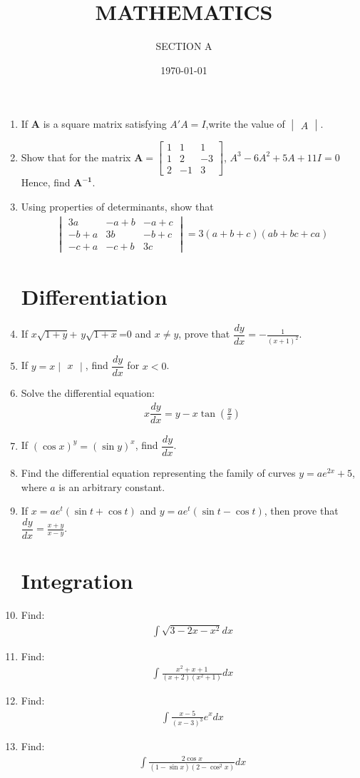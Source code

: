\documentclass[2pt,-letter paper]{article}
\title{MATHEMATICS}
\author{SECTION A}
\date{\today}
\let\vec\mathbf{}
\let\vec\mathbf{}
\let\vec\mathbf{}
\providecommand{\mydet}[1]{\ensuremath{\begin{vmatrix}#1\end{vmatrix}}}
\providecommand{\myvec}[1]{\ensuremath{\begin{bmatrix}#1\end{bmatrix}}}
\providecommand{\brak}[1]{\ensuremath{\left(#1\right)}}
\begin{document}
\maketitle

\begin{enumerate}
\section{Matrix}
\item If $\vec{A}$ is a square matrix satisfying $A'A = I$,write the value of $\mydet{A}$.
\item Show that for the matrix $\vec{A}=\myvec{1&1&1 \\ 1&2&-3 \\ 2&-1&3}$, ${A}^3-6{A}^2+5{A}+11{I}=0$ Hence, find $\vec{A^{-1}}$.
\item Using properties of determinants, show that 
\begin{align*}
\mydet{3a & -a+b & -a+c \\ -b+a & 3b & -b+c \\ -c+a & -c+b & 3c} = 3\brak{a+b+c}\brak{ab+bc+ca}
\end{align*}
\section{Differentiation}
\item If $x\sqrt{1+y}$+ $y\sqrt{1+x}$=0 and $x\neq y$, prove that $\dfrac{dy}{dx} = -\frac{1}{\brak{x+1}^2}$.
\item If $y=x\mydet{x}$, find $\dfrac{dy}{dx}$ for $x < 0$.
\item Solve the differential equation: 
\begin{align*}
{x}\dfrac{dy}{dx}= {y}-{x}\tan\brak{\frac{y}{x}}
\end{align*}
\item If $\brak{\cos x}^y = \brak{\sin y }^x$, find $\dfrac{dy}{dx}$.
\item Find the differential equation representing the family of curves ${y}=ae^{2x}+5$, where $a$ is an arbitrary constant.
\item If ${x}=ae^t\brak{\sin{t}+\cos{t}}$ and ${y}=ae^t\brak{\sin{t}-\cos{t}}$, then prove that $\dfrac{dy}{dx}=\frac{x+y}{x-y}$.
\section{Integration}
\item Find: \begin{align*}\int\sqrt{3-2x-x^2}dx\end{align*}
\item Find: \begin{align*}\int{\frac{x^2+x+1}{\brak{x+2}\brak{x^2+1}}}dx\end{align*}
\item Find: 
 \begin{align*}
 \int{\frac{x-5}{\brak{x-3}^3}}e^x dx
 \end{align*}
\item Find: 
\begin{align*}
\int{\frac{2\cos x}{\brak{1-\sin x}\brak{2-\cos^2 x}}}dx
\end{align*}  

\end{enumerate}
\end{document}
